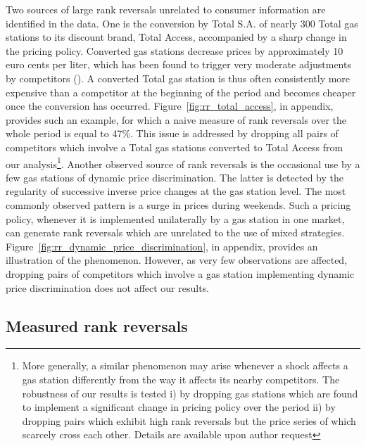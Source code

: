 \documentclass[english]{article}
\begin{document}
Two sources of large rank reversals unrelated to consumer information are identified in the data. One is the conversion by Total S.A. of nearly 300 Total gas stations to its discount brand, Total Access, accompanied by a sharp change in the pricing policy. Converted gas stations decrease prices by approximately 10 euro cents per liter, which has been found to trigger very moderate adjustments by competitors (\cite{CHA16}). A converted Total gas station is thus often consistently more expensive than a competitor at the beginning of the period and becomes cheaper once the conversion has occurred. Figure~\ref{fig:rr_total_access}, in appendix, provides such an example, for which a naive measure of rank reversals over the whole period is equal to 47\%. This issue is addressed by dropping all pairs of competitors which involve a Total gas stations converted to Total Access from our analysis\footnote{More generally, a similar phenomenon may arise whenever a shock affects a gas station differently from the way it affects its nearby competitors. The robustness of our results is tested i) by dropping gas stations which are found to implement a significant change in pricing policy over the period ii) by dropping pairs which exhibit high rank reversals but the price series of which scarcely cross each other. Details are available upon author request}. Another observed source of rank reversals is the occasional use by a few gas stations of dynamic price discrimination. The latter is detected by the regularity of successive inverse price changes at the gas station level. The most commonly observed pattern is a surge in prices during weekends. Such a pricing policy, whenever it is implemented unilaterally by a gas station in one market, can generate rank reversals which are unrelated to the use of mixed strategies. Figure~\ref{fig:rr_dynamic_price_discrimination}, in appendix, provides an illustration of the phenomenon. However, as very few observations are affected, dropping pairs of competitors which involve a gas station implementing dynamic price discrimination does not affect our results.

\subsection{Measured rank reversals}
\end{document}

